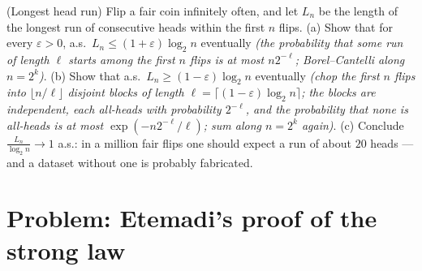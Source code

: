 \begin{exercise}[$\star\star$]\label{exo:b3:probability:12}
(Longest head run) Flip a fair coin infinitely often, and
let $L_n$ be the length of the longest run of consecutive
heads within the first $n$ flips.
(a) Show that for every $\varepsilon > 0$, a.s.\ $L_n \leq
(1 + \varepsilon)\log_2n$ eventually \emph{(the probability
that some run of length $\ell$ starts among the first $n$
flips is at most $n2^{-\ell}$; Borel--Cantelli along $n =
2^k$)}.
(b) Show that a.s.\ $L_n \geq (1 - \varepsilon)\log_2n$
eventually \emph{(chop the first $n$ flips into
$\lfloor n/\ell\rfloor$ disjoint blocks of length $\ell =
\lceil(1 - \varepsilon)\log_2n\rceil$; the blocks are
independent, each all-heads with probability $2^{-\ell}$,
and the probability that none is all-heads is at most
$\exp(-n2^{-\ell}/\ell)$; sum along $n = 2^k$ again)}.
(c) Conclude $\frac{L_n}{\log_2n} \to 1$ a.s.: in a million
fair flips one should expect a run of about $20$ heads ---
and a dataset without one is probably fabricated.
\end{exercise}

\section{Problem: Etemadi's proof of the strong law}

